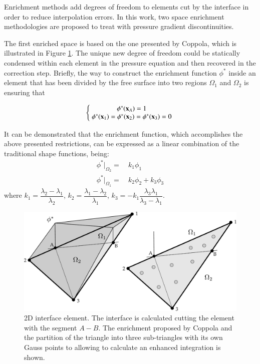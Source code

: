 Enrichment methods add degrees of freedom to elements cut by the interface in order to reduce interpolation errors. In this work, two space enrichment methodologies are proposed to treat with pressure gradient discontinuities.

The first enriched space is based on the one presented by Coppola\cite{Coppola05}, which is illustrated in Figure \ref{fg:enrichment1}. The unique new degree of freedom could be statically condensed within each element in the pressure equation and then recovered in the correction step. Briefly, the way to construct the enrichment function $\phi^*$ inside an element that has been divided by the free surface into two regions $\Omega_1$ and $\Omega_2$ is ensuring that

\begin{equation}
   \left\{\;
   \begin{matrix}
      \phi^*(\mathbf{x}_A)= 1 \\
      \phi^*(\mathbf{x}_1)= \phi^*(\mathbf{x}_2)=\phi^*(\mathbf{x}_3)= 0
   \end{matrix}\;
   \right.
   \label{eq:enrich-1a}
\end{equation}

It can be demonstrated\cite{Coppola05} that the enrichment function, which accomplishes the above presented restrictions, can be expressed as a linear combination of the traditional shape functions, being:
 \begin{align}
    \phi^*|_{\Omega_2} = & \ k_1 \phi_1 \label{phi_enrichment-2}\\
    \phi^*|_{\Omega_1} = & \ k_2 \phi_2 + k_3 \phi_3 \label{phi_enrichment-1}
  \end{align}
where $k_1 = \dfrac{\lambda_2-\lambda_1}{\lambda_2}$, $k_2 = \dfrac{\lambda_1-\lambda_2}{\lambda_1}$, $k_3 = -k_1\dfrac{\lambda_3\lambda_1}{\lambda_3-\lambda_1}$.

\begin{figure}[H]
  \centering
  \includegraphics[width=.9\columnwidth]{images/enrichment1.pdf}
   \caption{2D interface element. The interface is calculated cutting the element with the segment $A-B$. The enrichment proposed by Coppola and the partition of the triangle into three sub-triangles with its own Gauss points to allowing to calculate an enhanced integration is shown.}
   \label{fg:enrichment1}                %
\end{figure}

